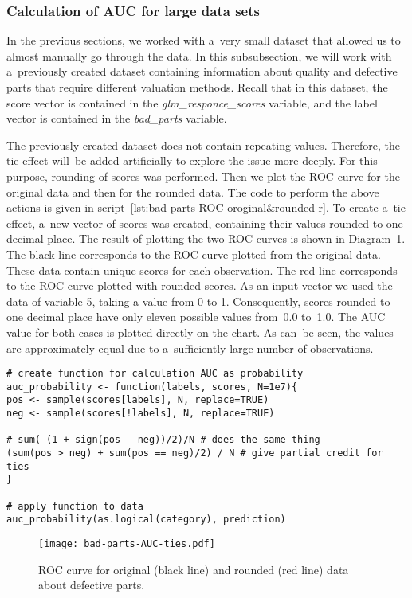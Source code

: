 \documentclass[]{scrreprt}
\begin{document}
\subsubsection{Calculation of AUC for large data sets}
In the previous sections, we worked with a~very small dataset that allowed us to almost manually go through the data. In this subsubsection, we will work with a~previously created dataset containing information about quality and defective parts that require different valuation methods. Recall that in this dataset, the score vector is contained in the \textit{glm\_responce\_scores} variable, and the label vector is contained in the \textit{bad\_parts} variable.

The previously created dataset does not contain repeating values. Therefore, the tie effect will~be added artificially to explore the issue more deeply. For this purpose, rounding of scores was performed. Then we plot the ROC curve for the original data and then for the rounded data. The code to perform the above actions is given in script~\ref{lst:bad-parts-ROC-oroginal&rounded-r}. To create a~tie effect, a~new vector of scores was created, containing their values rounded to one decimal place. The result of plotting the two ROC curves is shown in Diagram~\ref{fig:bad-parts-ROC-original&rounded-r}. The black line corresponds to the ROC curve plotted from the original data. These data contain unique scores for each observation. The red line corresponds to the ROC curve plotted with rounded scores. As an input vector we used the data of variable 5, taking a value from 0 to 1. Consequently, scores rounded to one decimal place have only eleven possible values from~0.0 to~1.0. The AUC value for both cases is plotted directly on the chart. As can~be seen, the values are approximately equal due to a~sufficiently large number of observations.
%
\begin{lstlisting}[float, caption = Plotting the ROC curve on the original (black line) and rounded (red line) defective parts data, firstnumber=1, label= lst:bad-parts-ROC-oroginal&rounded-r]
# create function for calculation AUC as probability
auc_probability <- function(labels, scores, N=1e7){
pos <- sample(scores[labels], N, replace=TRUE)
neg <- sample(scores[!labels], N, replace=TRUE)

# sum( (1 + sign(pos - neg))/2)/N # does the same thing
(sum(pos > neg) + sum(pos == neg)/2) / N # give partial credit for ties
}

# apply function to data
auc_probability(as.logical(category), prediction)
\end{lstlisting}
%
\begin{figure}[htp]
	\centering
	\texttt{[image: bad-parts-AUC-ties.pdf]}
	\caption{ROC curve for original (black line) and rounded (red line) data about defective parts.}
	\label{fig:bad-parts-ROC-original&rounded-r}
\end{figure}
%
\end{document}
